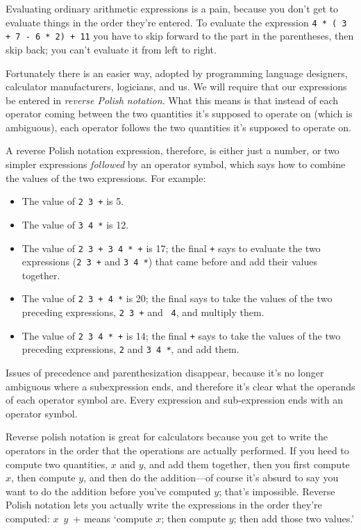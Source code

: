 Evaluating ordinary arithmetic expressions is a pain, because you don't
get to evaluate things in the order they're entered.  To evaluate the
expression \mbox{\tt 4 * ( 3 + 7 - 6 * 2) + 11} you have to skip forward to
the part in the parentheses, then skip back; you can't evaluate it from
left to right.

Fortunately there is an easier way, adopted by programming language
designers, calculator manufacturers, logicians, and us.  We will require
that our expressions be entered in {\em reverse Polish notation}\/.
What this means is that instead of each operator coming between the two
quantities it's supposed to operate on (which is ambiguous), each
operator follows the two quantities it's supposed to operate on.


A reverse Polish notation expression, therefore, is either just a
number, or two simpler expressions {\em followed}\/ by an operator
symbol, which says how to combine the values of the two expressions.
For example:
\begin{itemize}
\item The value of {\tt 2 3 +}  is 5.
\item The value of {\tt 3 4 *}  is 12.
\item The value of {\tt 2 3 + 3 4 * +} is 17; the final {\tt +} says to
evaluate the two expressions ({\tt 2 3 +} and {\tt 3 4 *}) that came
before and add their values together.
\item The value of {\tt 2 3 + 4 *} is 20; the final {\tt *} says to
take the values of the two preceding expressions, {\tt 2 3 +} and {\tt
4}, and multiply them.
\item The value of {\tt 2 3 4 * +} is 14; the final {\tt +} says to take
the values of the two preceding expressions, {\tt 2} and {\tt 3 4 *},
and add them.
\end{itemize}

Issues of precedence and parenthesization disappear, because it's no
longer ambiguous where a subexpression ends, and therefore it's clear
what the operands of each operator symbol are.  Every expression and
sub-expression ends with an operator symbol.  

Reverse polish notation is great for calculators because you get to
write the operators in the order that the operations are actually
performed.  If you heed to compute two quantities, $x$ and $y$, and add
them together, then you first compute $x$, then compute $y$, and then do
the addition---of course it's absurd to say you want to do the addition
before you've computed $y$; that's impossible.  Reverse Polish notation
lets you actually write the expressions in the order they're computed:
\mbox{$x$ $y$ +} means `compute $x$; then compute $y$; then add those
two values.'

